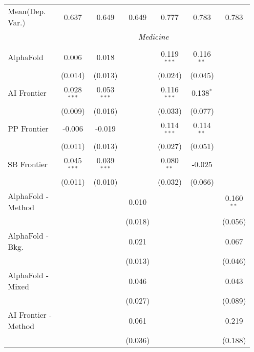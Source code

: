 \begin{tabular}{lcccccc}
Mean(Dep. Var.) & 0.637 & 0.649 & 0.649 & 0.777 & 0.783 & 0.783 \\
 & \multicolumn{6}{c}{\textit{Medicine}} \\ \\
   AlphaFold            & 0.006         & 0.018         &                & 0.119$^{***}$ & 0.116$^{**}$ &   \\   
                        & (0.014)       & (0.013)       &                & (0.024)       & (0.045)      &   \\   
   AI Frontier          & 0.028$^{***}$ & 0.053$^{***}$ &                & 0.116$^{***}$ & 0.138$^{*}$  &   \\   
                        & (0.009)       & (0.016)       &                & (0.033)       & (0.077)      &   \\   
   PP Frontier          & -0.006        & -0.019        &                & 0.114$^{***}$ & 0.114$^{**}$ &   \\   
                        & (0.011)       & (0.013)       &                & (0.027)       & (0.051)      &   \\   
   SB Frontier          & 0.045$^{***}$ & 0.039$^{***}$ &                & 0.080$^{**}$  & -0.025       &   \\   
                        & (0.011)       & (0.010)       &                & (0.032)       & (0.066)      &   \\   
   AlphaFold - Method   &               &               & 0.010          &               &              & 0.160$^{**}$\\   
                        &               &               & (0.018)        &               &              & (0.056)\\   
   AlphaFold - Bkg.     &               &               & 0.021          &               &              & 0.067\\   
                        &               &               & (0.013)        &               &              & (0.046)\\   
   AlphaFold - Mixed    &               &               & 0.046          &               &              & 0.043\\   
                        &               &               & (0.027)        &               &              & (0.089)\\   
   AI Frontier - Method &               &               & 0.061          &               &              & 0.219\\   
                        &               &               & (0.036)        &               &              & (0.188)\\   

\end{tabular}
